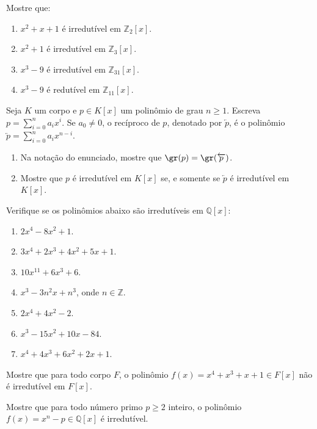\begin{exer} Mostre que:
    \begin{enumerate}
        \item $x^2 +x+1$ é irredutível em $\mathbb Z_2[x]$.
        \item $x^2 +1$ é irredutível em $\mathbb Z_3[x]$.
        \item $x^3-9$ é irredutível em $\mathbb Z_{31}[x]$.
        \item $x^3-9$ é redutível em $\mathbb Z_{11}[x]$.
    \end{enumerate}
\end{exer}

\begin{exer} Seja $K$ um corpo e $p \in K[x]$ um polinômio de grau $n\geq 1$. Escreva $p=\sum_{i=0}^n a_i x^i$. Se $a_0\neq 0$, o recíproco de $p$, denotado por $\overleftarrow{p}$, é o polinômio $\overleftarrow{p}=\sum_{i=0}^n a_i x^{n-i}$.
    \begin{enumerate}
        \item Na notação do enunciado, mostre que $\gr(p)=\gr(\overleftarrow{p})$.
        \item Mostre que $p$ é irredutível em $K[x]$ se, e somente se $\overleftarrow{p}$ é irredutível em $K[x]$.
    \end{enumerate}
\end{exer}

\begin{exer} Verifique se os polinômios abaixo são irredutíveis em $\mathbb Q[x]$:
    \begin{enumerate}
        \item $2x^4 - 8x^2 + 1$.
        \item $3x^4 + 2x^3 + 4x^2 + 5x + 1$.
        \item $10x^{11} + 6x^3 + 6$.
        \item $x^3 - 3n^2x + n^3$, onde $n \in \mathbb Z$.
        \item $2x^4 + 4x^2 - 2$.
        \item $x^3 - 15x^2 + 10x - 84$.
        \item $x^4 + 4x^3 + 6x^2 + 2x + 1$.
    \end{enumerate}
\end{exer}

\begin{exer} Mostre que para todo corpo $F$, o polinômio $f(x) = x^4 +x^3 +x+1 \in F[x]$ não é irredutível em $F[x]$.
\end{exer}

\begin{exer} Mostre que para todo número primo $p\geq 2$ inteiro, o polinômio $f(x) = x^n-p \in \mathbb Q[x]$ é irredutível.
\end{exer}